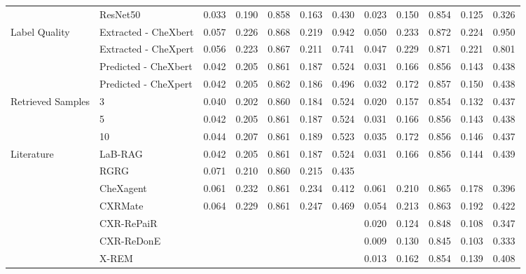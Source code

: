 \begin{tabular}{llrrrrrrrrrr}
 & ResNet50 & 0.033 & 0.190 & 0.858 & 0.163 & 0.430 & 0.023 & 0.150 & 0.854 & 0.125 & 0.326 \\
\cmidrule{1-12}
\multirow[c]{4}{*}{Label Quality} & Extracted - CheXbert & 0.057 & 0.226 & 0.868 & 0.219 & 0.942 & 0.050 & 0.233 & 0.872 & 0.224 & 0.950 \\
 & Extracted - CheXpert & 0.056 & 0.223 & 0.867 & 0.211 & 0.741 & 0.047 & 0.229 & 0.871 & 0.221 & 0.801 \\
 & Predicted - CheXbert & 0.042 & 0.205 & 0.861 & 0.187 & 0.524 & 0.031 & 0.166 & 0.856 & 0.143 & 0.438 \\
 & Predicted - CheXpert & 0.042 & 0.205 & 0.862 & 0.186 & 0.496 & 0.032 & 0.172 & 0.857 & 0.150 & 0.438 \\
\cmidrule{1-12}
\multirow[c]{3}{*}{Retrieved Samples} & 3 & 0.040 & 0.202 & 0.860 & 0.184 & 0.524 & 0.020 & 0.157 & 0.854 & 0.132 & 0.437 \\
 & 5 & 0.042 & 0.205 & 0.861 & 0.187 & 0.524 & 0.031 & 0.166 & 0.856 & 0.143 & 0.438 \\
 & 10 & 0.044 & 0.207 & 0.861 & 0.189 & 0.523 & 0.035 & 0.172 & 0.856 & 0.146 & 0.437 \\
\cmidrule{1-12}
\multirow[c]{7}{*}{Literature} & LaB-RAG & 0.042 & 0.205 & 0.861 & 0.187 & 0.524 & 0.031 & 0.166 & 0.856 & 0.144 & 0.439 \\
 & RGRG & 0.071 & 0.210 & 0.860 & 0.215 & 0.435 &  &  &  &  &  \\
 & CheXagent & 0.061 & 0.232 & 0.861 & 0.234 & 0.412 & 0.061 & 0.210 & 0.865 & 0.178 & 0.396 \\
 & CXRMate & 0.064 & 0.229 & 0.861 & 0.247 & 0.469 & 0.054 & 0.213 & 0.863 & 0.192 & 0.422 \\
 & CXR-RePaiR &  &  &  &  &  & 0.020 & 0.124 & 0.848 & 0.108 & 0.347 \\
 & CXR-ReDonE &  &  &  &  &  & 0.009 & 0.130 & 0.845 & 0.103 & 0.333 \\
 & X-REM &  &  &  &  &  & 0.013 & 0.162 & 0.854 & 0.139 & 0.408 \\
\cmidrule{1-12}
\bottomrule
\end{tabular}
